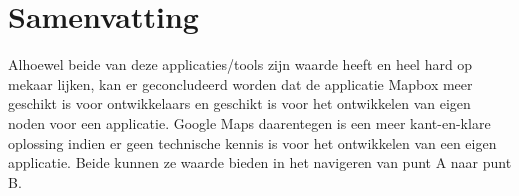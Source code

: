 \section{Samenvatting}
\label{sec:samenvatting}
Alhoewel beide van deze applicaties/tools zijn waarde heeft en heel hard op mekaar lijken, kan er geconcludeerd worden dat de applicatie Mapbox meer geschikt is voor ontwikkelaars en geschikt is voor het ontwikkelen van eigen noden voor een applicatie. Google Maps daarentegen is een meer kant-en-klare oplossing indien er geen technische kennis is voor het ontwikkelen van een eigen applicatie. Beide kunnen ze waarde bieden in het navigeren van punt A naar punt B.






